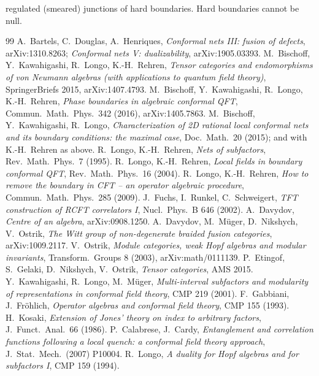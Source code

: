 \documentclass[11pt]{article}
\theoremstyle{definition}
\theoremstyle{remark}
\begin{document}
regulated (smeared) junctions of hard boundaries. Hard boundaries cannot be null.


\begin{thebibliography}{99}\small
{} A.~Bartels, C.~Douglas, A.~Henriques, \emph{Conformal nets III: fusion of defects}, arXiv:1310.8263; \emph{Conformal nets V: dualizability}, arXiv:1905.03393.
 M.~Bischoff, Y.~Kawahigashi, R.~Longo, K.-H.~Rehren, \emph{Tensor categories and endomorphisms of von Neumann algebras (with applications to quantum field theory)}, SpringerBriefs 2015, arXiv:1407.4793.
 M.~Bischoff, Y.~Kawahigashi, R.~Longo, K.-H.~Rehren, \emph{Phase boundaries in algebraic conformal QFT}, Commun.\ Math.\ Phys.\ 342 (2016), arXiv:1405.7863.
 M.~Bischoff, Y.~Kawahigashi, R.~Longo, \emph{Characterization of 2D rational local conformal nets and its boundary conditions: the maximal case}, Doc.\ Math.\ 20 (2015); and with K.-H.~Rehren as above.
 R.~Longo, K.-H.~Rehren, \emph{Nets of subfactors}, Rev.\ Math.\ Phys.\ 7 (1995).
 R.~Longo, K.-H.~Rehren, \emph{Local fields in boundary conformal QFT}, Rev.\ Math.\ Phys.\ 16 (2004).
 R.~Longo, K.-H.~Rehren, \emph{How to remove the boundary in CFT -- an operator algebraic procedure}, Commun.\ Math.\ Phys.\ 285 (2009).
 J.~Fuchs, I.~Runkel, C.~Schweigert, \emph{TFT construction of RCFT correlators I}, Nucl.\ Phys.\ B 646 (2002).
 A.~Davydov, \emph{Centre of an algebra}, arXiv:0908.1250.
 A.~Davydov, M.~M\"uger, D.~Nikshych, V.~Ostrik, \emph{The Witt group of non-degenerate braided fusion categories}, arXiv:1009.2117.
 V.~Ostrik, \emph{Module categories, weak Hopf algebras and modular invariants}, Transform.\ Groups 8 (2003), arXiv:math/0111139.
 P.~Etingof, S.~Gelaki, D.~Nikshych, V.~Ostrik, \emph{Tensor categories}, AMS 2015.
 Y.~Kawahigashi, R.~Longo, M.~M\"uger, \emph{Multi-interval subfactors and modularity of representations in conformal field theory}, CMP 219 (2001).
 F.~Gabbiani, J.~Fr\"ohlich, \emph{Operator algebras and conformal field theory}, CMP 155 (1993).
 H.~Kosaki, \emph{Extension of Jones' theory on index to arbitrary factors}, J.\ Funct.\ Anal.\ 66 (1986).
 P.~Calabrese, J.~Cardy, \emph{Entanglement and correlation functions following a local quench: a conformal field theory approach}, J.\ Stat.\ Mech.\ (2007) P10004.
 R.~Longo, \emph{A duality for Hopf algebras and for subfactors I}, CMP 159 (1994).

\end{thebibliography}
\end{document}
